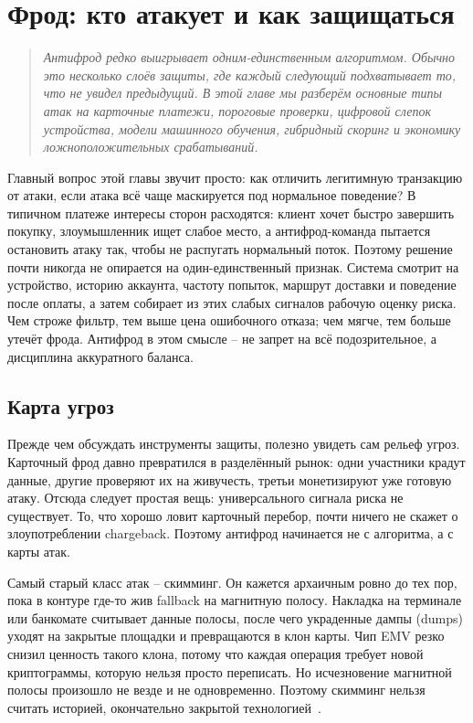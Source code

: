 
\chapter{Фрод: кто атакует и как защищаться}
\label{ch:fraud}
\begin{quote}
  \itshape
  Антифрод редко выигрывает одним-единственным алгоритмом. Обычно это
  несколько слоёв защиты, где каждый следующий подхватывает то, что
  не увидел предыдущий. В этой главе мы разберём основные типы атак
  на карточные платежи, пороговые проверки, цифровой слепок
  устройства, модели машинного обучения, гибридный скоринг и
  экономику ложноположительных срабатываний.
\end{quote}

Главный вопрос этой главы звучит просто: как отличить легитимную
транзакцию от атаки, если атака всё чаще маскируется под нормальное
поведение? В типичном платеже интересы сторон расходятся: клиент
хочет быстро завершить покупку, злоумышленник ищет слабое место, а
антифрод-команда пытается остановить атаку так, чтобы не распугать
нормальный поток. Поэтому решение почти никогда не опирается на
один-единственный признак. Система смотрит на устройство, историю
аккаунта, частоту попыток, маршрут доставки и поведение после оплаты,
а затем собирает из этих слабых сигналов рабочую оценку риска. Чем
строже фильтр, тем выше цена ошибочного отказа; чем мягче, тем больше
утечёт фрода. Антифрод в этом смысле -- не запрет на всё
подозрительное, а дисциплина аккуратного баланса.

\section{Карта угроз}
\label{sec:fraud-threats}

Прежде чем обсуждать инструменты защиты, полезно увидеть сам рельеф
угроз. Карточный фрод давно превратился в разделённый рынок: одни
участники крадут данные, другие проверяют их на живучесть, третьи
монетизируют уже готовую атаку. Отсюда следует простая вещь:
универсального сигнала риска не существует. То, что хорошо ловит
карточный перебор, почти ничего не скажет о злоупотреблении
chargeback. Поэтому антифрод начинается не с алгоритма, а с карты
атак.

Самый старый класс атак -- скимминг. Он кажется архаичным ровно до
тех пор, пока в контуре где-то жив fallback на магнитную полосу.
Накладка на терминале или банкомате считывает данные полосы,
после чего украденные дампы (dumps) уходят на закрытые площадки и
превращаются в клон карты. Чип EMV резко снизил ценность такого
клона, потому что каждая операция требует новой криптограммы, которую
нельзя просто переписать. Но исчезновение магнитной полосы произошло
не везде и не одновременно. Поэтому скимминг нельзя считать историей,
окончательно закрытой технологией~\cite{emvco-book1}.

